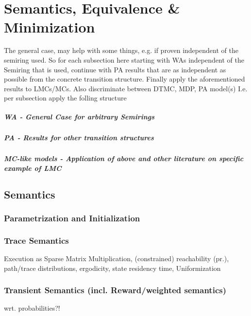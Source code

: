 \chapter{Semantics, Equivalence \& Minimization}\label{\positionnumber}  
        The general case, may help with some things, e.g. if proven independent of the semiring used. So for each subsection here starting with WAs independent of the Semiring that is used, continue with PA results that are as independent as possible from the concrete transition structure. Finally apply the aforementioned results to LMCs/MCs. Also discriminate between DTMC, MDP, PA model(s) I.e. per subsection apply the folling structure
        
            \paragraph{WA - General Case for arbitrary Semirings}
            
            \paragraph{PA - Results for other transition structures}
            
            \paragraph{MC-like models - Application of above and other literature on specific example of LMC}


    \section{Semantics}
        \subsection{Parametrization and Initialization}
    
        \subsection{Trace Semantics}
            Execution as Sparse Matrix Multiplication, 
            (constrained) reachability (pr.), path/trace distributions,
            ergodicity, state residency time, Uniformization
            
        
        
        \subsection{Transient Semantics (incl. Reward/weighted semantics)}
        wrt. probabilities?!
            
